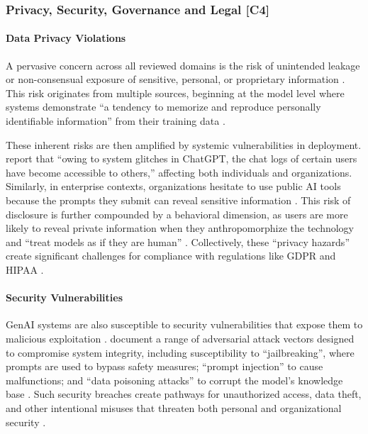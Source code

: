 \subsubsection{Privacy, Security, Governance and Legal [C4]}
\paragraph{Data Privacy Violations}
A pervasive concern across all reviewed domains is the risk of unintended leakage or non-consensual exposure of sensitive, personal, or proprietary information \parencite{S01, S02, R08, R09, S08, S11, S15, S16, S17}. This risk originates from multiple sources, beginning at the model level where systems demonstrate \enquote{a tendency to memorize and reproduce personally identifiable information} from their training data \parencite{S09}.

These inherent risks are then amplified by systemic vulnerabilities in deployment. \citeauthor{S09} report that \enquote{owing to system glitches in ChatGPT, the chat logs of certain users have become accessible to others,} affecting both individuals and organizations. Similarly, in enterprise contexts, organizations hesitate to use public AI tools because the prompts they submit can reveal sensitive information \parencite{R03}. This risk of disclosure is further compounded by a behavioral dimension, as users are more likely to reveal private information when they anthropomorphize the technology and \enquote{treat models as if they are human} \parencite{S09}. Collectively, these ``privacy hazards'' \parencite{S09} create significant challenges for compliance with regulations like GDPR and HIPAA \parencite{S09, S16}.

\paragraph{Security Vulnerabilities}
GenAI systems are also susceptible to security vulnerabilities that expose them to malicious exploitation \parencite{R03, S08, S10, S16, S17}. \citeauthor{S09} document a range of adversarial attack vectors designed to compromise system integrity, including susceptibility to ``jailbreaking'', where prompts are used to bypass safety measures; ``prompt injection'' to cause malfunctions; and ``data poisoning attacks'' to corrupt the model's knowledge base \parencite{S09}. Such security breaches create pathways for unauthorized access, data theft, and other intentional misuses that threaten both personal and organizational security \parencite{S08, S09}.

